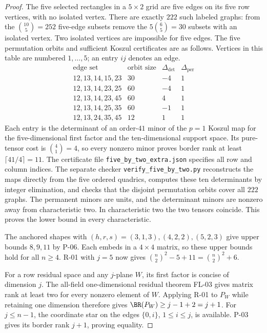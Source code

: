 \begin{proof}
The five selected rectangles in a $5\times2$ grid are
five edges on its five row vertices, with no isolated
vertex. There are exactly $222$ such labeled graphs:
from the $\binom{10}{5}=252$ five-edge subsets remove
the $5\binom65=30$ subsets with an isolated vertex.
Two isolated vertices are impossible for five edges.
The five permutation orbits and sufficient Koszul
certificates are as follows. Vertices in this table
are numbered $1,\ldots,5$; an entry $ij$ denotes an edge.
\[
\begin{array}{c|r|rr}
 \text{edge set}&\text{orbit size}&\Delta_{\det}&\Delta_{\mathrm{per}}\\ \hline
 12,13,14,15,23&30&-4&1\\
 12,13,14,23,25&60&-4&1\\
 12,13,14,23,45&60&4&1\\
 12,13,14,25,35&60&-1&1\\
 12,13,24,35,45&12&1&1
\end{array}
\]
Each entry is the determinant of an order-$41$ minor of
the $p=1$ Koszul map for the five-dimensional first
factor and the ten-dimensional support space. Its
pure-tensor cost is $\binom41=4$, so every nonzero
minor proves border rank at least
$\lceil41/4\rceil=11$. The certificate file
\texttt{five\_by\_two\_extra.json} specifies all row and
column indices. The separate checker
\texttt{verify\_five\_by\_two.py} reconstructs the maps
directly from the five ordered quadrics, computes these
ten determinants by integer elimination, and checks
that the disjoint permutation orbits cover all $222$
graphs. The permanent minors are units, and the
determinant minors are nonzero away from characteristic
two. In characteristic two the two tensors coincide.
This proves the lower bound in every characteristic.

The anchored shapes with $(h,r,s)=(3,1,3),(4,2,2),
(5,2,3)$ give upper bounds $8,9,11$ by P-06.
Each embeds in a $4\times4$ matrix, so these upper
bounds hold for all $n\geq4$. R-01 with $j=5$ now
gives $\binom n2^{2}-5+11=\binom n2^{2}+6$.

For a row residual space and any $j$-plane $W$, its
first factor is concise of dimension $j$. The all-field
one-dimensional residual theorem FL-03 gives matrix
rank at least two for every nonzero element of $W$.
Applying R-01 to $P_W$ while retaining one dimension
therefore gives $\BR(P_W)\geq j-1+2=j+1$.
For $j\leq n-1$, the coordinate star on the edges
$\{0,i\}$, $1\leq i\leq j$, is available. P-03 gives
its border rank $j+1$, proving equality.
\end{proof}


